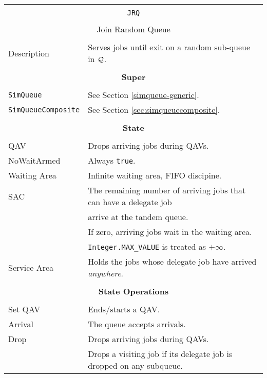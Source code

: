 \begin{tabular}{|l|l|}
	\hline
	\multicolumn{2}{|c|}{} \\
	\multicolumn{2}{|c|}{\lstinline[basicstyle=\large]{JRQ}} \\
	\multicolumn{2}{|c|}{} \\
	\multicolumn{2}{|c|}{Join Random Queue} \\
	\multicolumn{2}{|c|}{} \\
	\hline
	Description & Serves jobs until exit on a random sub-queue in $\cal{Q}$. \\
	\hline
	\multicolumn{2}{|c|}{} \\
	\multicolumn{2}{|c|}{\bf Super} \\
	\multicolumn{2}{|c|}{} \\
	\hline
	\lstinline|SimQueue| & See Section \ref{simqueue-generic}. \\
	\lstinline|SimQueueComposite| & See Section \ref{sec:simqueuecomposite}. \\
	\hline
	\multicolumn{2}{|c|}{} \\
	\multicolumn{2}{|c|}{\bf State} \\
	\multicolumn{2}{|c|}{} \\
	\hline
	QAV & Drops arriving jobs during QAVs. \\
	\hline
	NoWaitArmed & Always \lstinline|true|. \\
	\hline
	Waiting Area & Infinite waiting area, FIFO discipine. \\
	\hline
	SAC & The remaining number of arriving jobs that can have a delegate job \\
	& arrive at the tandem queue. \\
	& If zero, arriving jobs wait in the waiting area. \\
	& \lstinline|Integer.MAX_VALUE| is treated as $+\infty$. \\
	\hline
	Service Area & Holds the jobs whose delegate job have arrived {\em anywhere}. \\
	\hline
	\multicolumn{2}{|c|}{} \\
	\multicolumn{2}{|c|}{\bf State Operations} \\
	\multicolumn{2}{|c|}{} \\
	\hline
	Set QAV & Ends/starts a QAV. \\
	\hline
	Arrival & The queue accepts arrivals. \\
	\hline
	Drop & Drops arriving jobs during QAVs. \\
	& Drops a visiting job if its delegate job is dropped on any subqueue. \\

\end{tabular}
